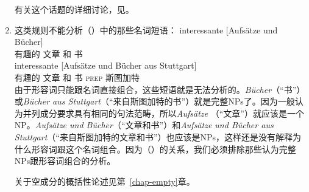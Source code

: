 \begin{enumerate}
有关这个话题的详细讨论，见。\nocite{MuellerLehrbuch1}

\item %

这类规则不能分析（）中的那些名词短语：
\eal
\ex 
\gll interessante [Aufsätze und Bücher]\\
     有趣的 \spacebr{}文章 和 书\\
\ex 
\gll interessante [Aufsätze und Bücher aus Stuttgart]\\
     有趣的 \spacebr{}文章 和 书 \textsc{prep} 斯图加特\\
\zl
由于形容词只能跟名词直接组合，这些短语就是无法分析的。\emph{Bücher}（“书”）或\emph{Bücher aus Stuttgart}（“来自斯图加特的书”）就是完整NPs了。因为一般认为并列成分要求具有相同的句法范畴，所以\emph{Aufsätze} （“文章”）就应该是一个NP。\emph{Aufsätze und Bücher}（“文章和书”）和\emph{Aufsätze und Bücher aus
  Stuttgart}（“来自斯图加特的文章和书”）也应该是NPs，这样还是没有解释为什么形容词跟这个名词组合。因为（）的关系，我们必须排除那些认为完整NPs跟形容词组合的分析。

关于空成分的概括性论述见第~\ref{chap-empty}章。


\end{enumerate}

